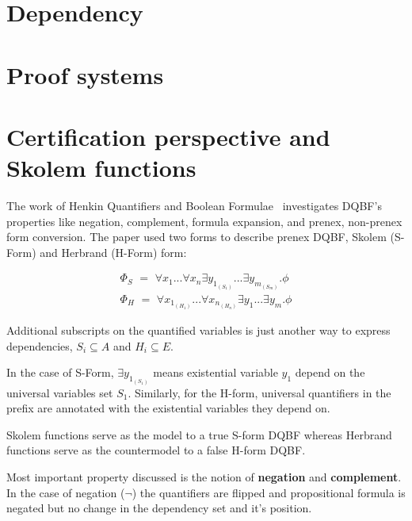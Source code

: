 \documentclass{article}
\begin{document}
\section{Dependency}

\section{Proof systems}

\section{Certification perspective and Skolem functions}

The work of Henkin Quantifiers and Boolean Formulae~\cite{balabanov2012henkin} investigates DQBF's properties like negation, complement, formula expansion, and prenex, non-prenex form conversion. 
%
The paper used two forms to describe prenex DQBF, Skolem (S-Form) and Herbrand (H-Form) form:

\begin{align}
	\Phi_{S} \,\, = \,\, \forall x_{1}... \forall x_{n} \exists y_{1_{(S_{1})}}...\exists y_{m_{(S_{m})}} . \phi \label{eq1}\\
	\Phi_{H}  \,\, = \,\, \forall x_{1_{(H_{1})}}... \forall x_{n_{(H_{n})}} \exists y_{1}...\exists y_{m} . \phi \label{eq2}
\end{align}

Additional subscripts on the quantified variables is just another way to express dependencies, $S_{i} \subseteq A$ and $H_{i} \subseteq E$.

In the case of S-Form, $\exists y_{1_{(S_{1})}}$ means  existential variable $y_{1}$ depend on the universal variables set $S_{1}$. 
%
Similarly, for the H-form, universal quantifiers in the prefix are annotated with the existential variables they depend on. 
     
Skolem functions serve as the model to a true S-form DQBF whereas Herbrand functions serve as the countermodel to a false H-form DQBF.

Most important property discussed is the notion of \textbf{negation} and \textbf{complement}.
%
In the case of negation ($\neg$) the quantifiers are flipped and propositional formula is negated but no change in the dependency set and it's position.
 
\end{document}
